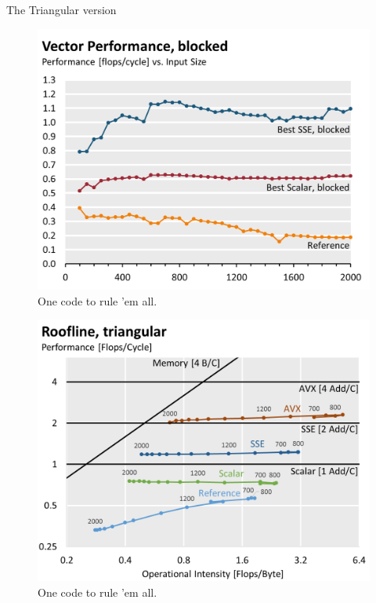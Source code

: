 The Triangular version 

\begin{figure}[htb]\centering
  \includegraphics[width=\linewidth]{plot_data/blocked_vector_performance.png}
  \caption{One code to rule 'em all.}
  \label{fig:perf-blocked}
\end{figure}
\begin{figure}[htb]\centering
  \includegraphics[width=\linewidth]{roofline-data/roofline_triangular.png}
  \caption{One code to rule 'em all.}
  \label{fig:roofline-triangular}
\end{figure}
